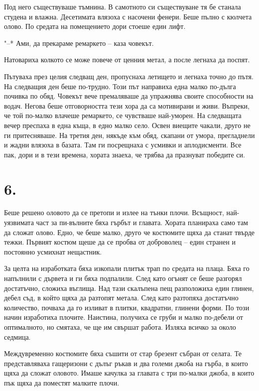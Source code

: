 \documentclass[ebook,openany,12pt]{memoir}
\begin{document}
Под него съществуваше тъмнина. В самотното си съществуване тя бе станала студена и влажна. Десетимата влязоха с насочени фенери. Беше пълно с кюлчета олово. По средата на помещението дори стоеше един лифт.

"--* Ами, да прекараме ремаркето – каза човекът.

Натовариха колкото се може повече от ценния метал, а после легнаха да поспят.

Пътуваха през целия следващ ден, пропуснаха летището и легнаха точно до пътя. На следващия ден беше по-трудно. Този път направиха една малко по-дълга почивка по обяд. Човекът вече премаляваше да упражнява своите способности на водач. Негова беше отговорността тези хора да са мотивирани и живи. Въпреки, че той по-малко влачеше ремаркето, се чувстваше най-уморен. На следващата вечер преспаха в една къща, в едно малко село. Освен виещите чакали, друго не ги притесняваше. На третия ден, някъде към обяд, скапани от умора, прегладнели и жадни влязоха в базата. Там ги посрещнаха с усмивки и аплодисменти. Все пак, дори и в тези времена, хората знаеха, че трябва да празнуват победите си.

\section*{6.}

Беше решено оловото да се претопи и излее на тънки плочи. Всъщност, най-уязвимата част за пи-вълните бяха гърбът и главата. Хората планираха само там да сложат олово. Едно, че беше малко, друго че костюмите щяха да станат твърде тежки. Първият костюм щеше да се пробва от доброволец – един странен и постоянно усмихнат нещастник.

За целта на изработката бяха изкопали плитък трап по средата на плаца. Бяха го напълнили с дървета и ги бяха подпалили. След като огънят се беше разгорял достатъчно, сложиха въглища. Над тази скалъпена пещ разположиха един глинен, дебел съд, в който щяха да разтопят метала. След като разтопяха достатъчно количество, почваха да го изливат в плитки, квадратни, глинени форми. По този начин изработиха плочите. Наистина, получиха се груби и малко по-дебели от оптималното, но смятаха, че ще им свършат работа. Изляха всичко за около седмица.

Междувременно костюмите бяха съшити от стар брезент събран от селата. Те представляваха гащеризони с дълъг ръкав и два големи джоба на гърба, в които щяха да сложат оловото. Имаше качулка за главата с три по-малки джоба, в които пък щяха да поместят малките плочи.
\end{document}
